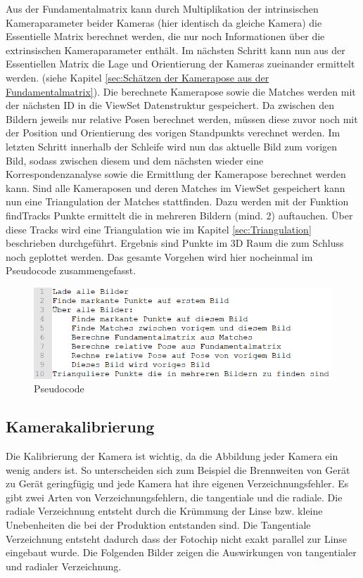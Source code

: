 Aus der Fundamentalmatrix kann durch Multiplikation der intrinsischen Kameraparameter beider Kameras (hier identisch da gleiche Kamera) die Essentielle Matrix berechnet werden, die nur noch Informationen über die extrinsischen Kameraparameter enthält. Im nächsten Schritt kann nun aus der Essentiellen Matrix die Lage und Orientierung der Kameras zueinander ermittelt werden. (siehe Kapitel \ref{sec:Schätzen der Kamerapose aus der Fundamentalmatrix}).
Die berechnete Kamerapose sowie die Matches werden mit der nächsten ID in die ViewSet  Datenstruktur gespeichert. Da zwischen den Bildern jeweils nur relative Posen berechnet werden, müssen diese zuvor noch mit der Position und Orientierung des vorigen Standpunkts verechnet werden. 
Im letzten Schritt innerhalb der Schleife wird nun das aktuelle Bild zum vorigen Bild, sodass zwischen diesem und dem nächsten wieder eine Korrespondenzanalyse sowie die Ermittlung der Kamerapose berechnet werden kann.
Sind alle Kameraposen und deren Matches im ViewSet gespeichert kann nun eine Triangulation der Matches stattfinden. Dazu werden mit der Funktion findTracks Punkte ermittelt die in mehreren Bildern (mind. 2) auftauchen. Über diese Tracks wird eine Triangulation wie im Kapitel \ref{sec:Triangulation} beschrieben durchgeführt. Ergebnis sind Punkte im 3D Raum die zum Schluss noch geplottet werden.
Das gesamte Vorgehen wird hier nocheinmal im Pseudocode zusammengefasst.
\begin{figure}[ht]
    \centering
    \includegraphics[scale=0.75]{Figures/Pseudocode.PNG}
    \caption{Pseudocode}
\end{figure}

\subsection{Kamerakalibrierung}
\label{sec:Kamerakalibrierung}
Die Kalibrierung der Kamera ist wichtig, da die Abbildung jeder Kamera ein wenig anders ist. So unterscheiden sich zum Beispiel die Brennweiten von Gerät zu Gerät geringfügig und jede Kamera hat ihre eigenen Verzeichnungsfehler.
Es gibt zwei Arten von Verzeichnungsfehlern, die tangentiale und die radiale. Die radiale Verzeichnung entsteht durch die Krümmung der Linse bzw. kleine Unebenheiten die bei der Produktion entstanden sind. Die Tangentiale Verzeichnung entsteht dadurch dass der Fotochip nicht exakt parallel zur Linse eingebaut wurde. Die Folgenden Bilder zeigen die Auswirkungen von tangentialer und radialer Verzeichnung.\cite{Verlag}

